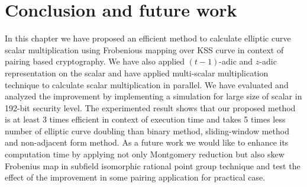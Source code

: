 \section{Conclusion and future work}
In this chapter we have proposed an efficient method to calculate elliptic curve scalar multiplication using Frobenious mapping  over KSS curve in context of pairing based cryptography. We have also applied $(t-1)$-adic and $z$-adic representation on the scalar and have applied multi-scalar multiplication technique to  calculate scalar multiplication in parallel. We have evaluated and analyzed the improvement by implementing a simulation for large size of scalar in 192-bit security level. The experimented result shows that our proposed method is at least 3 times efficient in context of execution time and takes 5 times less number of elliptic curve doubling than binary method, sliding-window method and non-adjacent form method. As a future work we would like to enhance its computation time by applying not only Montgomery reduction but also skew Frobenius  map in  subfield isomorphic rational point group technique and test the effect of the improvement in some pairing application for practical case. 